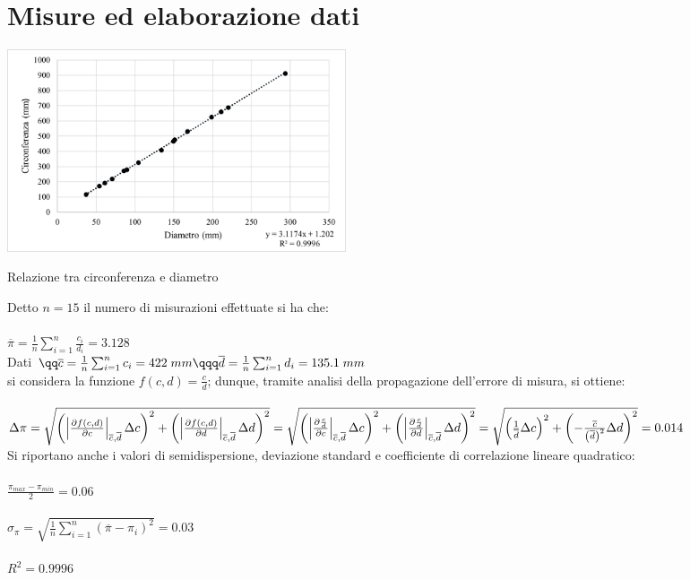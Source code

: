 \section*{Misure ed elaborazione dati}
\everymath{\displaystyle}

\nls
\begin{plt}[h!]
    \hspace{5mm}
    \includegraphics[width=10cm]{plots/plt1.png}
    \caption{Relazione tra circonferenza e diametro}
    \label{plt1}
\end{plt}
\newpage
Detto $n = 15$ il numero di misurazioni effettuate si ha che:\\ \\ 
$\overline{\pi} = \frac{1}{n}\sum_{i=1}^{n} \frac{c_i}{d_i} = 3.128$\\ 
\snls
Dati $\qq \overline{c} = \frac{1}{n} \sum_{i = 1}^{n} c_i = 422\;mm \qqq  \overline{d} = \frac{1}{n} \sum_{i = 1}^{n} d_i = 135.1\;mm$\\ 
si considera la funzione $f(c,d) = \frac{c}{d}$; dunque, tramite analisi della propagazione dell'errore di misura, si ottiene: \\ \\ 
$\Delta \pi = \sqrt{\left(\left|\frac{\partial f(c,d)}{\partial c} \right|_{\overline{c}, \overline{d}} \Delta c \right)^2 +
\left(\left|\frac{\partial f(c,d)}{\partial d} \right|_{\overline{c}, \overline{d}} \Delta d \right)^2} = 
\sqrt{\left(\left|\frac{\partial \frac{c}{d}}{\partial c} \right|_{\overline{c}, \overline{d}} \Delta c \right)^2 +
\left(\left|\frac{\partial \frac{c}{d}}{\partial d} \right|_{\overline{c}, \overline{d}} \Delta d \right)^2} \\ 
= \sqrt{\left(\frac{1}{\overline{d}} \Delta c \right)^2 +
\left(-\frac{\overline{c}}{\left(\overline{d}\right)^2} \Delta d \right)^2} = 0.014$\\ 
\snls 
Si riportano anche i valori di semidispersione, deviazione standard e coefficiente di correlazione lineare quadratico:\\ \\ 
$\frac{\pi_{max}- \pi_{min}}{2} = 0.06$\\\\
$\sigma_{\pi} = \sqrt{\frac{1}{n}\sum_{i=1}^{n}(\overline{\pi}-\pi_i)^2} = 0.03$\\\\
$R^2 = 0.9996$

